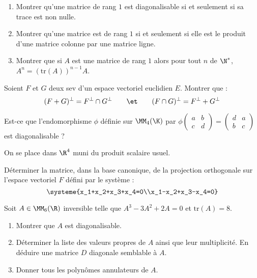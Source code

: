 \documentclass[french,11pt,twoside]{VcCours}
\begin{document}


\begin{Exercice}
  \begin{enumerate}
    \item Montrer qu’une matrice de rang $1$ est diagonalisable si et seulement si sa trace est non nulle.
    \item Montrer qu’une matrice est de rang $1$ si et seulement si elle est le produit d’une matrice colonne par une matrice ligne.
    \item Montrer que si $A$ est une matrice de rang $1$ alors pour tout $n$ de $\N^*$, $A^n=(\text{tr}(A))^{n-1}A$.
  \end{enumerate}
\end{Exercice}


\begin{Exercice}
  Soient $F$ et $G$ deux sev d’un espace vectoriel euclidien $E$. Montrer que :
 \[(F+G)^{\perp}=F^{\perp}\cap G^{\perp}\qquad\et\qquad (F\cap G)^{\perp}=F^{\perp}+G^{\perp}\]
\end{Exercice}


\begin{Exercice}
  Est-ce que l’endomorphisme $\phi$ définie sur $\MM_4(\K)$ par
  $\phi\left(\begin{matrix}
    a&b\\c&d
  \end{matrix}\right)=\left(\begin{matrix}
    d&a\\b&c
  \end{matrix}\right)$
  est diagonalisable ?
\end{Exercice}


\begin{Exercice}
  On se place dans $\R^4$ muni du produit scalaire usuel. 
  
  Déterminer la matrice, dans la base canonique, de la projection
  orthogonale sur l'espace vectoriel $F$ défini par le système :
  \[\systeme{x_1+x_2+x_3+x_4=0\\x_1-x_2+x_3-x_4=0}\]
\end{Exercice}


\begin{Exercice}
  Soit $A\in\MM_6(\R)$ inversible telle que $A^3-3A^2+2A=0$ et $\text{tr}(A)=8$.
  \begin{enumerate}
    \item Montrer que $A$ est diagonalisable.
    \item Déterminer la liste des valeurs propres de $A$ ainsi que leur multiplicité. 
    En déduire une matrice $D$ diagonale semblable à $A$.
    \item Donner tous les polynômes annulateurs de $A$.
  \end{enumerate}
\end{Exercice}
\end{document}
